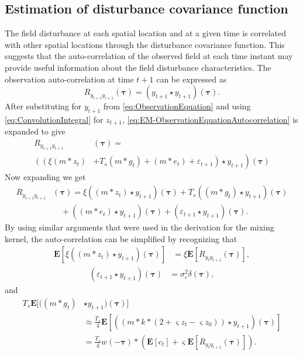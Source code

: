 \documentclass[10pt,twocolumn,twoside]{IEEEtran}
\begin{document}
\subsection{Estimation of disturbance covariance function}
The field disturbance at each spatial location and at a given time is correlated with other spatial locations through the disturbance covariance
function. This suggests that the auto-correlation of the observed field at each time instant may provide useful information about the field disturbance characteristics.
The observation auto-correlation at time $t+1$ can be expressed as
\begin{equation}\label{eq:EM-ObservationEquationAutocorrelation}
	R_{y_{t+1}y_{t+1}}(\boldsymbol{\tau})=(y_{t+1} \star y_{t+1})(\boldsymbol\tau).
\end{equation}
 After substituting for $y_{t+1}$ from \eqref{eq:ObservationEquation} and using \eqref{eq:ConvolutionIntegral}   for $z_{t+1}$,  \eqref{eq:EM-ObservationEquationAutocorrelation} is expanded to give 
\begin{align}\label{eq:EM-expanded_auto_corr}  
	R_{y_{t+1}y_{t+1}} & (\boldsymbol{\tau}) = \\ \nonumber 
	\left( \left(\xi( m\ast z_{t}) \right.\right.&+\left.\left. T_s(m\ast g_{t}) + ( m \ast e_{t})+\varepsilon_{t+1} \right) \star y_{t+1} \right) (\boldsymbol{\tau})
\end{align}
Now expanding we get
\begin{align}\label{eq:expanded_auto_corr}
	R_{y_{t+1}y_{t+1}}&(\boldsymbol{\tau}) = \xi((m \ast z_{t}) \star y_{t+1})(\boldsymbol{\tau})+T_s((m\ast g_{t})\star y_{t+1})(\boldsymbol{\tau}) \nonumber \\
	&\quad+((m\ast e_{t})\star  y_{t+1})(\boldsymbol{\tau})+(\varepsilon_{t+1} \star y_{t+1})(\boldsymbol{\tau}).
\end{align}
By using similar arguments that were used in the derivation for the mixing kernel, the auto-correlation can be simplified by recognizing that
\begin{align}\label{eq:EM-Autoterm1} 
  \mathbf{E}[\xi((m\ast z_{t})\star y_{t+1})(\boldsymbol{\tau})]&=\xi \mathbf{E}[ R_{y_ty_{t+1}}(\boldsymbol{\tau})],
\end{align}
\begin{align}\label{eq:EM-Autoterm2}
 (\varepsilon_{t+1}\star y_{t+1})(\boldsymbol\tau)&=\sigma_{\varepsilon}^2\delta(\boldsymbol{\tau}),
\end{align} 
and
\begin{align}\label{eq:EM-Autoterm3} 
	T_s\mathbf{E}[((m\ast g_t) &\star y_{t+1})(\boldsymbol\tau)] \nonumber \\ 
	&\approx \frac{T_s}{4}\mathbf{E}[((m \ast k \ast (2 + \varsigma z_t - \varsigma z_0))\star y_{t+1})(\boldsymbol\tau)] \nonumber \\
	&= \frac{T_s}{4} w(-\boldsymbol\tau) \ast (\mathbf{E}\left[c_t\right] + \varsigma \mathbf{E}\left[R_{y_ty_{t+1}}(\boldsymbol\tau)\right] ).
\end{align}
\end{document}
